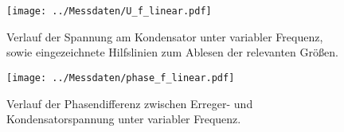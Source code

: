 \begin{figure}
  \centering
  \texttt{[image: ../Messdaten/U\_f\_linear.pdf]}
  \caption{Verlauf der Spannung am Kondensator unter variabler Frequenz, sowie eingezeichnete Hilfslinien zum Ablesen der relevanten Größen.}
  \label{fig: spannungsverlauf_U_C}
\end{figure}

\begin{figure}
  \centering
  \texttt{[image: ../Messdaten/phase\_f\_linear.pdf]}
  \caption{Verlauf der Phasendifferenz zwischen Erreger- und Kondensatorspannung unter variabler Frequenz.}
  \label{fig: phasenverlauf}
\end{figure}
